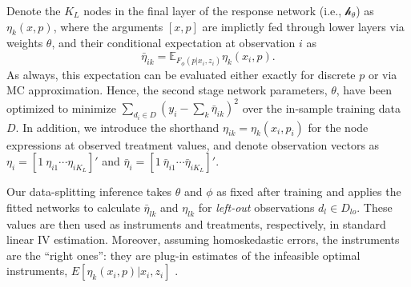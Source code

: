 \documentclass[12pt]{article}
\newcommand{\ds}[1]{\mathds{#1}}
\newcommand{\cf}{\ensuremath{\mathscr{h}}}
\begin{document}
Denote the $K_L$ nodes in the final layer of the response network (i.e., $\cf_\theta$) as 
$\eta_{k}(x,p)$, where the arguments $[x,p]$ are implictly fed through lower layers via weights $\theta$, and their conditional expectation at observation $i$ as
\begin{equation}\label{etabar}
 \bar\eta_{ik} = \ds{E}_{F_\phi( p|x_i,z_i)}\eta_k(x_i, p).
 \end{equation} 
As always, this expectation can be evaluated either exactly for discrete $p$ or via MC approximation.
Hence, the second stage network parameters, $\theta$, have been optimized to minimize
$
\sum_{d_i \in D} \left(y_i - \sum_k \bar\eta_{ik} \right)^2
$
over the in-sample training data $D$.  In addition, we introduce the shorthand 
$\eta_{ik} = \eta_k(x_i, p_i)$ for the node expressions at observed treatment values, and denote observation vectors as ${\eta}_i = [1~\eta_{i1} \cdots \eta_{iK_L}]'$ and ${\bar\eta}_i = [1~\bar\eta_{i1} \cdots \bar\eta_{iK_L}]'$.

Our data-splitting inference takes $\theta$ and $\phi$ as fixed after training and applies the fitted networks to calculate $\bar\eta_{lk}$ and $\eta_{lk}$ for {\it left-out} observations $d_l \in D_{lo}$.  
These values are then used as instruments and treatments, respectively, in standard linear IV estimation.
Moreover, assuming homoskedastic errors, the instruments are the ``right ones'': they are plug-in estimates of the infeasible optimal instruments, $E[\eta_{k}(x_i,p)|x_i,z_i]$ \citep{chamberlain1987}.
\end{document}
